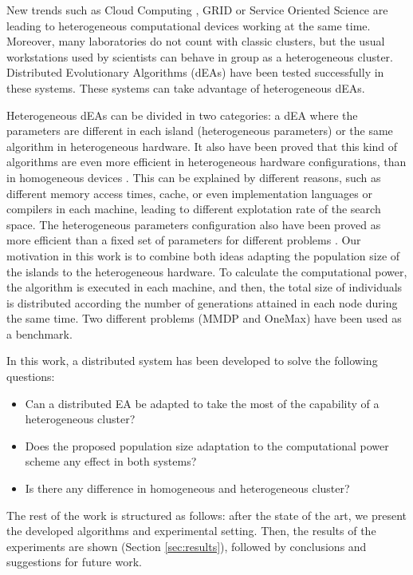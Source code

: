 New trends such as Cloud Computing \cite{CLOUD}, GRID \cite{OPENSCIENCEGRID} or Service Oriented Science \cite{GLOBUS} are leading to heterogeneous computational devices working at the same time.  Moreover, many laboratories do not count with classic clusters, but the usual workstations used by scientists can behave in group as a heterogeneous cluster. Distributed Evolutionary Algorithms (dEAs) have been tested successfully in these systems. These systems can take advantage of heterogeneous dEAs. 

Heterogeneous dEAs can be divided in two categories: a dEA where the parameters are different in each island (heterogeneous parameters) or the same algorithm in heterogeneous hardware. It also have been proved that this kind of algorithms are even more efficient in heterogeneous hardware configurations, than in homogeneous devices \cite{HETEROGENEOUSHARD}. This can be explained by different reasons, such as different memory access times, cache, or even implementation languages or compilers in each machine, leading to different explotation rate of the search space. The heterogeneous parameters configuration also have been proved as more efficient than a fixed set of parameters for different problems \cite{HETEROGENEOUSPARAMETERS}. Our motivation in this work is to combine both ideas adapting the population size of the islands to the heterogeneous hardware. To calculate the computational power, the algorithm is executed in each machine, and then, the total size of individuals is distributed according the number of generations attained in each node during the same time. Two different problems (MMDP and OneMax) have been used as a benchmark.


In this work, a distributed system has been developed to solve the following questions:
\begin{itemize}
 \item Can a distributed EA be adapted to take the most of the capability of a heterogeneous cluster?
 \item Does the proposed population size adaptation to the computational power scheme any effect in both systems?
 \item Is there any difference in homogeneous and heterogeneous cluster?
\end{itemize}


The rest of the work is structured as follows: after the state of
the art, we present the developed algorithms and experimental setting. 
Then, the results of the experiments are shown (Section \ref{sec:results}), followed by conclusions and suggestions for future work.


